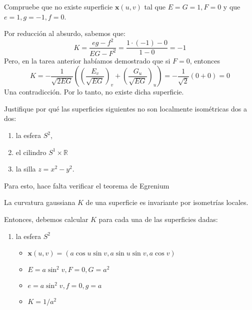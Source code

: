 \begin{problema}Compruebe que no existe superficie $\mathbf{x}(u, v)$ tal que $E=G=1, F=0$ y que $e=1, g=-1, f=0$.
    \begin{sol}
        Por reducción al absurdo, sabemos que: 
        $$K = \frac{eg - f^2}{EG - F^2}= \frac{1 \cdot (-1) - 0}{1 - 0} = -1$$
        Pero, en la tarea anterior habíamos demostrado que si $F=0$, entonces
            $$K=-\frac{1}{\sqrt{2EG}}\left(\left(\frac{E_v}{\sqrt{EG}}\right)_v+\left(\frac{G_u}{\sqrt{EG}}\right)_u\right)=-\frac{1}{\sqrt{2}}\left(0+0\right)=0$$
            Una contradicción. Por lo tanto, no existe dicha superficie. 
    \end{sol}
\end{problema}

\begin{problema} Justifique por qué las superficies siguientes no son localmente isométricas dos a dos:
    \begin{enumerate}
        \item la esfera $S^2$,
        
        \item el cilindro $S^1 \times \mathbb{R}$
        
        \item la silla $z=x^2-y^2$.
       
    \end{enumerate}
    \begin{sol}
        Para esto, hace falta verificar el teorema de Egrenium 
        \begin{cajita}
            \begin{teorema}[Egrenium]
                La curvatura gaussiana $K$ de una superficie es invariante por isometrías locales.
            \end{teorema}
        \end{cajita}
        Entonces, debemos calcular $K$ para cada una de las superficies dadas: 
        \begin{enumerate}
            \item la esfera $S^2$
            \begin{itemize}
                \item $\mathbf{x}(u,v)=(a\cos u \sin v,a\sin u\sin v, a\cos v)$
                \item $E=a\sin^2v, F=0,G=a^2$
                \item $e=a\sin^2v,f=0,g=a$
                \item $K=1/a^2$
            \end{itemize}
            

\end{enumerate}
\end{sol}
\end{problema}
